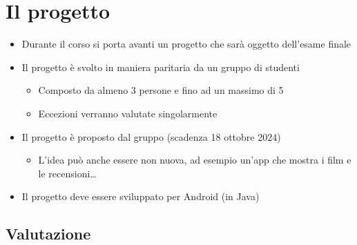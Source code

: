 \section{Il progetto}
\begin{itemize}
    \item Durante il corso si porta avanti un progetto che sarà oggetto dell'esame finale
    \item Il progetto è svolto in maniera paritaria da un gruppo di studenti
    \begin{itemize}
        \item Composto da almeno 3 persone e fino ad un massimo di 5
        \item Eccezioni verranno valutate singolarmente
    \end{itemize}
    \item Il progetto è proposto dal gruppo (scadenza 18 ottobre 2024)
    \begin{itemize}
        \item L'idea può anche essere non nuova, ad esempio un'app che mostra i film e le recensioni\dots
    \end{itemize}
    \item Il progetto deve essere sviluppato per Android (in Java)
\end{itemize}

\subsection{Valutazione}